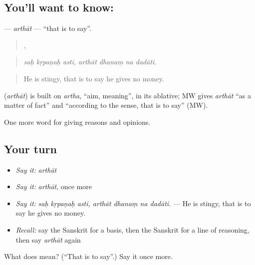 \subsection*{You'll want to know: }
\textbf{} — \emph{arthāt} — \textquotedblleft{}that is to say\textquotedblright{}.

\begin{quote}
  ,    
\end{quote}

\begin{quote}
\emph{saḥ kṛpaṇaḥ asti, arthāt dhanaṃ na dadāti.}
\end{quote}

\begin{quote}
He is stingy, that is to say he gives no money.
\end{quote}

\begin{cousinweb}
\textbf{} (\emph{arthāt}) is built on \emph{artha}, \textquotedblleft{}aim, meaning\textquotedblright{}, in its ablative; MW gives \emph{arthāt} \textquotedblleft{}as a matter of fact\textquotedblright{} and \textquotedblleft{}according to the sense, that is to say\textquotedblright{} (MW).
\end{cousinweb}

\begin{grammarlens}[title={What you've built}]
One more word for giving reasons and opinions.
\end{grammarlens}

\subsection*{Your turn}
\begin{itemize}
\raggedright
  \item \emph{Say it:} \emph{arthāt}
  \item \emph{Say it:} \emph{arthāt}, once more
  \item \emph{Say it:} \emph{saḥ kṛpaṇaḥ asti, arthāt dhanaṃ na dadāti.} — He is stingy, that is to say he gives no money.
  \item \emph{Recall:} say the Sanskrit for a basis, then the Sanskrit for a line of reasoning, then say \emph{arthāt} again
\end{itemize}

\begin{tcolorbox}[breakable,colback=teal!4,colframe=teal!35!black,title={Before you move on}]
What does  mean? (\textquotedblleft{}That is to say\textquotedblright{}.) Say it once more.
\end{tcolorbox}

